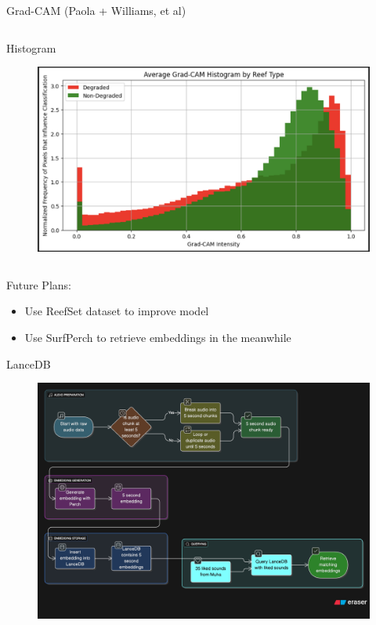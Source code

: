 \begin{frame}{Grad-CAM (Paola + Williams, et al)}
\begin{columns}
        \begin{column}{0.33\textwidth}
            Histogram
            \begin{figure}
                \centering
                \includegraphics[width=\linewidth,keepaspectratio]{images/Histogram_grad_cam_new.png}
            \end{figure}
        \end{column}
    \end{columns}
    Future Plans:
        \begin{itemize}
            \item Use ReefSet dataset to improve model
            \item Use SurfPerch to retrieve embeddings in the meanwhile
        \end{itemize}
\end{frame}

\begin{frame}{LanceDB}
    \begin{figure}
        \centering
        \includegraphics[width=\linewidth,height=0.8\textheight,keepaspectratio]{images/LanceDB workflow.jpg}
    \end{figure}
\end{frame}

